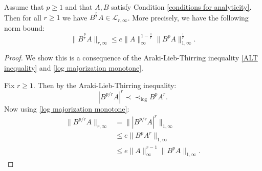     \begin{lem}\label{1 to r lemma} 
        Assume that $p\geq 1$ and that $A,B$ satisfy Condition \ref{conditions for analyticity}. Then for all $r \geq 1$ we have $B^{\frac{p}{r}}A\in\mathcal{L}_{r,\infty}$. More precisely, we have the following norm bound:
        \begin{equation*}
            \|B^{\frac{p}{r}}A\|_{r,\infty}\leq e\|A\|_{\infty}^{1-\frac1r}\|B^pA\|_{1,\infty}^{\frac1r}.
        \end{equation*}
    \end{lem}
    \begin{proof} 
        We show this is a consequence of the Araki-Lieb-Thirring inequality \eqref{ALT inequality} and \eqref{log majorization monotone}.
        
        Fix $r \geq 1$. Then by the Araki-Lieb-Thirring inequality:
        \begin{equation*}
            |B^{p/r}A|^r \prec\prec_{\log} B^pA^r.
        \end{equation*}
        Now using \eqref{log majorization monotone}:
        \begin{align*}
            \|B^{p/r}A\|_{r,\infty} &= \||B^{p/r}A|^r\|_{1,\infty}\\
                                    &\leq e\|B^pA^r\|_{1,\infty}\\
                                    &\leq e\|A\|_\infty^{r-1}\|B^pA\|_{1,\infty}.
        \end{align*}
    \end{proof}
    
